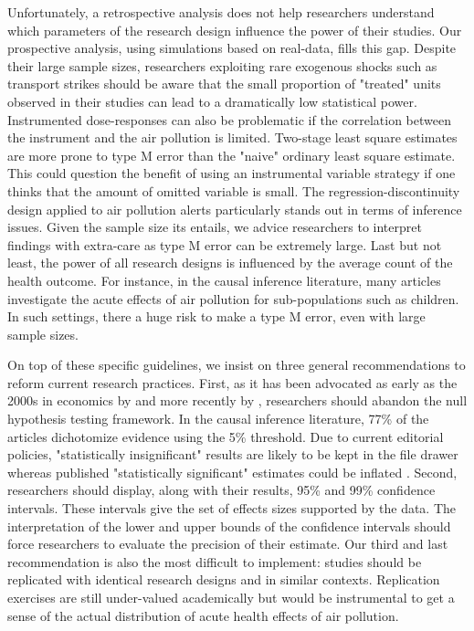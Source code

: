 \documentclass[12pt]{article}
\begin{document}
Unfortunately, a retrospective analysis does not help researchers understand which parameters of the research design influence the power of their studies. Our prospective analysis, using simulations based on real-data, fills this gap. Despite their large sample sizes, researchers exploiting rare exogenous shocks such as transport strikes should be aware that the small proportion of "treated" units observed in their studies can lead to a dramatically low statistical power. Instrumented dose-responses can also be problematic if the correlation between the instrument and the air pollution is limited. Two-stage least square estimates are more prone to type M error than the "naive" ordinary least square estimate. This could question the benefit of using an instrumental variable strategy if one thinks that the amount of omitted variable is small.
The regression-discontinuity design applied to air pollution alerts particularly stands out in terms of inference issues. Given the sample size its entails, we advice researchers to interpret findings with extra-care as type M error can be extremely large. Last but not least, the power of all research designs is influenced by the average count of the health outcome. For instance, in the causal inference literature, many articles investigate the acute effects of air pollution for sub-populations such as children. In such settings, there a huge risk to make a type M error, even with large sample sizes.

On top of these specific guidelines, we insist on three general recommendations to reform current research practices. %
First, as it has been advocated as early as the 2000s in economics by \cite{ziliak_cult_2008} and more recently by \cite{gelman_regression_nodate}, researchers should abandon the null hypothesis testing framework. In the causal inference literature, 77\% of the articles dichotomize evidence using the 5\% threshold. Due to current editorial policies, "statistically insignificant" results are likely to be kept in the file drawer whereas published "statistically significant" estimates could be inflated \citep{ioannidis_why_2005}. Second, researchers should display, along with their results, 95\% and 99\% confidence intervals. These intervals give the set of effects sizes supported by the data. The interpretation of the lower and upper bounds of the confidence intervals should force researchers to evaluate the precision of their estimate. Our third and last recommendation is also the most difficult to implement: studies should be replicated with identical research designs and in similar contexts. Replication exercises are still under-valued academically but would be instrumental to get a sense of the actual distribution of acute health effects of air pollution.
\end{document}
